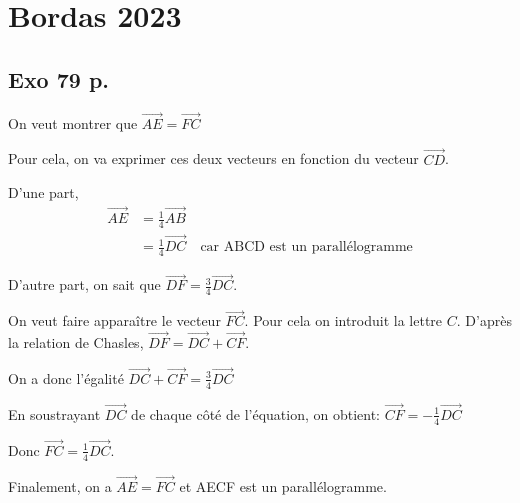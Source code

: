 \documentclass[10pt,a4paper,openany,twoside]{book}
\begin{document}
\section{Bordas 2023}
\subsection{Exo 79 p.}
On veut montrer que $\vec{AE}=\vec{FC}$

Pour cela, on va exprimer ces deux vecteurs en fonction du vecteur $\vec{CD}$.

\bigskip
D'une part,
\begin{align*}
    \vec{AE}
    &= \frac{1}{4}\vec{AB}\\
    &= \frac{1}{4}\vec{DC} \quad \text{car ABCD est un parallélogramme}
\end{align*}

\bigskip
D'autre part, on sait que $\vec{DF} = \frac{3}{4}\vec{DC}$.

On veut faire apparaître le vecteur $\vec{FC}$. Pour cela on introduit la lettre $C$. D'après la relation de Chasles, $\vec{DF} = \vec{DC}+\vec{CF}$.

On a donc l'égalité $\vec{DC}+\vec{CF}= \frac{3}{4}\vec{DC}$

\medskip
En soustrayant $\vec{DC}$ de chaque côté de l'équation, on obtient:
$\vec{CF}= -\frac{1}{4}\vec{DC}$

Donc $\vec{FC} = \frac{1}{4}\vec{DC}$.

\bigskip
Finalement, on a $\vec{AE}=\vec{FC}$ et AECF est un parallélogramme.
\end{document}

